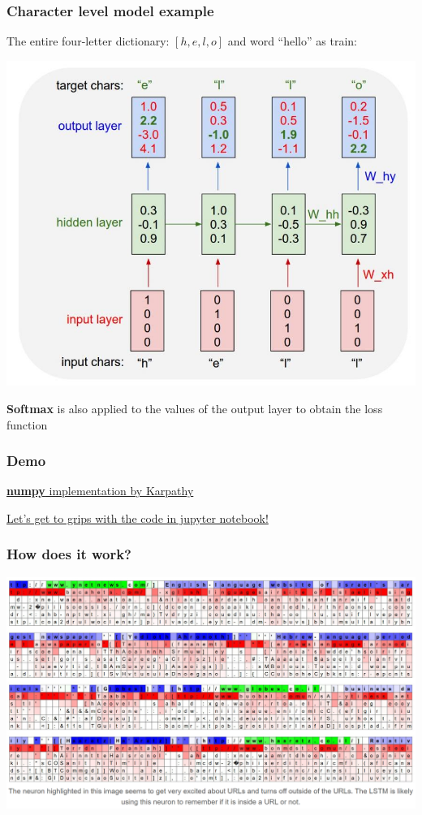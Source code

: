 \documentclass[fullscreen=true, bookmarks=true, hyperref={pdfencoding=unicode}]{beamer}
\begin{document}
\begin{frame}
\frametitle{Character level model example}

    The entire four-letter dictionary: $[h, e, l, o]$ and word ``hello'' as train:

    \begin{center}
      \includegraphics[keepaspectratio,
                       width=0.6\paperwidth]{rnn_char_level_example.jpg}
    \end{center}

    {\bf Softmax} is also applied to the values of the output layer to obtain the loss function
\end{frame}


\begin{frame}
  \frametitle{Demo}

  \href{https://gist.github.com/karpathy/d4dee566867f8291f086}{{\bf numpy} implementation by Karpathy}

  \vspace{1cm}
  \href{https://github.com/avalur/ml-course-kbtu/tree/main/week09_rnn/rnn_demo.ipynb}{Let's get to grips with the code in jupyter notebook!}
\end{frame}


\begin{frame}
  \frametitle{How does it work?}

  \includegraphics[keepaspectratio,
                   width=.85\paperwidth]{url_neuron.png}

\end{frame}
\end{document}
